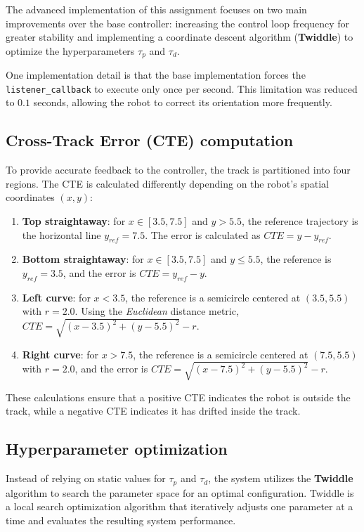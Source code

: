 \documentclass[12pt]{article}
\begin{document}
The advanced implementation of this assignment focuses on two main improvements over the base
controller: increasing the control loop frequency for greater stability and implementing a coordinate
descent algorithm (\textbf{Twiddle}) to optimize the hyperparameters $\tau_p$ and $\tau_d$.

One implementation detail is that the base implementation forces the \texttt{listener\_callback} to
execute only once per second. This limitation was reduced to $0.1$ seconds, allowing the robot to
correct its orientation more frequently.

\subsection{Cross-Track Error (CTE) computation}

To provide accurate feedback to the controller, the track is partitioned into four regions. The CTE
is calculated differently depending on the robot's spatial coordinates $(x,y)$:

\begin{enumerate}
    \item \textbf{Top straightaway}: for $x \in [3.5, 7.5]$ and $y > 5.5$, the reference trajectory
          is the horizontal line $y_{ref} = 7.5$. The error is calculated as $CTE = y - y_{ref}$.
    \item \textbf{Bottom straightaway}: for $x \in [3.5, 7.5]$ and $y \leq 5.5$, the reference is
          $y_{ref} = 3.5$, and the error is $CTE = y_{ref} - y$.
    \item \textbf{Left curve}: for $x < 3.5$, the reference is a semicircle centered at $(3.5, 5.5)$
          with $r = 2.0$. Using the \textit{Euclidean} distance metric, $CTE = \sqrt{(x-3.5)^2 + (y-5.5)^2} - r$.
    \item \textbf{Right curve}: for $x > 7.5$, the reference is a semicircle centered at $(7.5, 5.5)$
          with $r = 2.0$, and the error is $CTE = \sqrt{(x-7.5)^2 + (y-5.5)^2} - r$.
\end{enumerate}

These calculations ensure that a positive CTE indicates the robot is outside the track, while a
negative CTE indicates it has drifted inside the track.

\subsection{Hyperparameter optimization}

Instead of relying on static values for $\tau_p$ and $\tau_d$, the system utilizes the \textbf{Twiddle}
algorithm to search the parameter space for an optimal configuration. Twiddle is a local search
optimization algorithm that iteratively adjusts one parameter at a time and evaluates the resulting
system performance.
\end{document}
